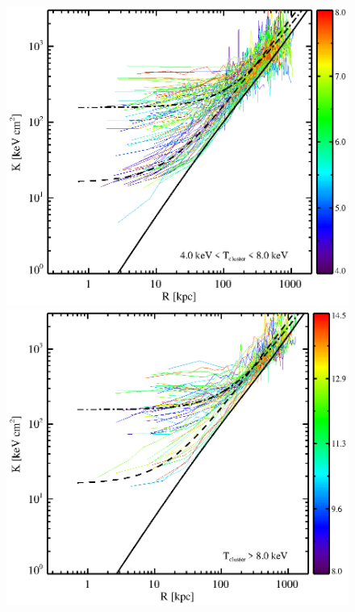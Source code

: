 \begin{center}
\begin{figure}[htp]
\begin{minipage}[htp]{0.5\linewidth}
    \end{minipage}
    \begin{minipage}[htp]{0.5\linewidth}
      \includegraphics*[width=\textwidth, trim=28mm 7mm 30mm 17mm, clip]{splots_gt4tle8}
    \end{minipage}
    \begin{minipage}[htp]{0.5\linewidth}
      \includegraphics*[width=\textwidth, trim=28mm 7mm 30mm 17mm, clip]{splots_tgt8}
    \end{minipage}

\end{figure}
\end{center}
